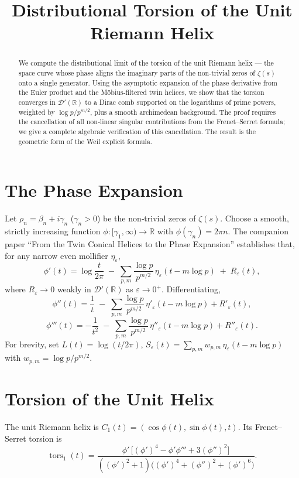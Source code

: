 \documentclass[12pt,a4paper]{article}
\title{\bf Distributional Torsion of the Unit Riemann Helix}
\author{}
\date{}
\newcommand{\R}{\mathbb{R}}
\newcommand{\dist}{\mathcal{D}'}
\newcommand{\tors}{\operatorname{tors}}
\newcommand{\wgt}{w}
\begin{document}
\maketitle

\begin{abstract}
We compute the distributional limit of the torsion of the unit Riemann helix --- the space curve whose phase aligns the imaginary parts of the non‑trivial zeros of $\zeta(s)$ onto a single generator.  Using the asymptotic expansion of the phase derivative from the Euler product and the M\"obius‑filtered twin helices, we show that the torsion converges in $\dist(\R)$ to a Dirac comb supported on the logarithms of prime powers, weighted by $\log p/p^{m/2}$, plus a smooth archimedean background.  The proof requires the cancellation of all non‑linear singular contributions from the Frenet–Serret formula; we give a complete algebraic verification of this cancellation.  The result is the geometric form of the Weil explicit formula.
\end{abstract}

\section{The Phase Expansion}
Let $\rho_n = \beta_n + i\gamma_n$ ($\gamma_n>0$) be the non‑trivial zeros of $\zeta(s)$.  Choose a smooth, strictly increasing function $\phi:[\gamma_1,\infty)\to\R$ with $\phi(\gamma_n)=2\pi n$.  The companion paper ``From the Twin Conical Helices to the Phase Expansion'' establishes that, for any narrow even mollifier $\eta_\varepsilon$,
\[
\phi'(t) = \log\frac{t}{2\pi} \;-\; \sum_{p,m} \frac{\log p}{p^{m/2}} \, \eta_\varepsilon(t-m\log p) \;+\; R_\varepsilon(t),
\tag{1}
\]
where $R_\varepsilon\to0$ weakly in $\dist(\R)$ as $\varepsilon\to0^+$.  Differentiating,
\[
\phi''(t) = \frac{1}{t} \;-\; \sum_{p,m} \frac{\log p}{p^{m/2}} \, \eta'_\varepsilon(t-m\log p) + R'_\varepsilon(t),
\tag{2}
\]
\[
\phi'''(t) = -\frac{1}{t^2} \;-\; \sum_{p,m} \frac{\log p}{p^{m/2}} \, \eta''_\varepsilon(t-m\log p) + R''_\varepsilon(t).
\tag{3}
\]
For brevity, set $L(t)=\log(t/2\pi)$, $S_\varepsilon(t)=\sum_{p,m} \wgt_{p,m}\,\eta_\varepsilon(t-m\log p)$ with $\wgt_{p,m}=\log p/p^{m/2}$.

\section{Torsion of the Unit Helix}
The unit Riemann helix is $C_1(t)=(\cos\phi(t),\sin\phi(t),t)$.  Its Frenet–Serret torsion is
\[
\tors_1(t)=\frac{\phi'\,\bigl[(\phi')^4-\phi'\phi'''+3(\phi'')^2\bigr]}
                  {((\phi')^2+1)\bigl((\phi')^4+(\phi'')^2+(\phi')^6\bigr)} .
\tag{4}
\]
\end{document}
